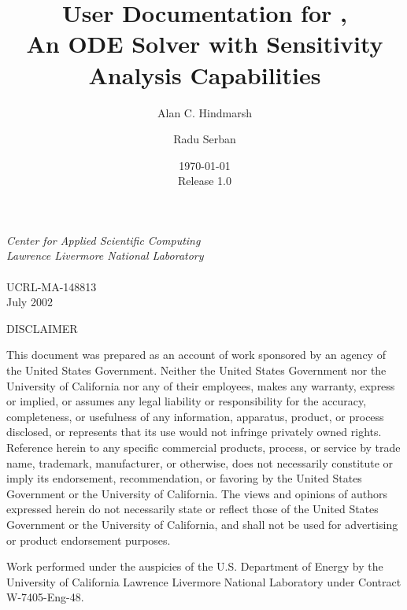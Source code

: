 \documentclass[11pt]{article}
\title{User Documentation for \cvodes, \\ 
An ODE Solver with Sensitivity Analysis Capabilities}
\author{
Alan C. Hindmarsh \and
Radu Serban
}
\date{\today\\Release 1.0}
\begin{document}
\maketitle\thispagestyle{empty}
\vfill
\noindent
{\large\em Center for Applied Scientific Computing} \\
{\large\em Lawrence Livermore National Laboratory}\\
\vspace{0.1in}\\
UCRL-MA-148813\\
July 2002
\newpage\thispagestyle{empty}
\vspace*{1.0in}
\begin{center}
\begin{minipage}{4.0in}
\scriptsize
\centerline{DISCLAIMER}
This document was prepared as an account of work sponsored by an
agency of the United States Government.
Neither the United States Government nor the University of California
nor any of their employees, makes any warranty, express or implied, or
assumes any legal liability or responsibility for the accuracy,
completeness, or usefulness of any information, apparatus, product, or
process disclosed, or represents that its use would not infringe
privately owned rights.
Reference herein to any specific commercial products, process, or
service by trade name, trademark, manufacturer, or otherwise, does not
necessarily constitute or imply its endorsement, recommendation, or
favoring by the United States Government or the University of
California.
The views and opinions of authors expressed herein do not necessarily
state or reflect those of the United States Government or the
University of California, and shall not be used for advertising or
product endorsement purposes.  

\vspace*{0.2in}

Work performed under the auspicies of the U.S. Department of Energy by the 
University of California Lawrence Livermore National Laboratory under Contract W-7405-Eng-48.
\par\vspace*{1.0in}
\end{minipage}
\end{center}

\newpage\pagestyle{plain}
\tableofcontents
\newpage
\listoftables
\newpage
\listoffigures
\end{document}
